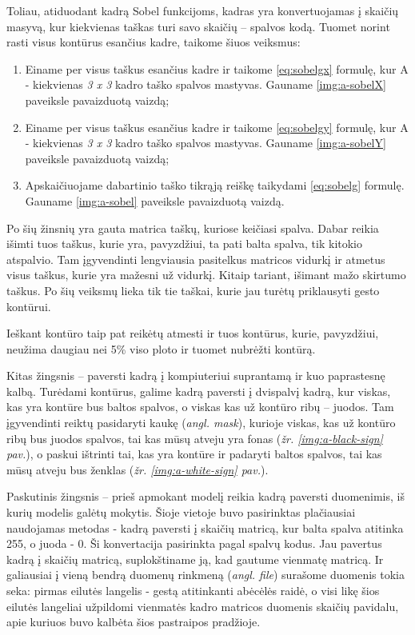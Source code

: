 \documentclass{VUMIFInfKursinis}
\begin{document}
Toliau, atiduodant kadrą Sobel funkcijoms, kadras yra konvertuojamas į skaičių masyvą, kur kiekvienas taškas turi savo skaičių – spalvos kodą. Tuomet norint rasti visus kontūrus esančius kadre, taikome šiuos veiksmus:

\begin{enumerate}
	\item Einame per visus taškus esančius kadre ir taikome \ref{eq:sobelgx} formulę, kur A - kiekvienas \textit{3 x 3} kadro taško spalvos mastyvas. Gauname \ref{img:a-sobelX} paveiksle pavaizduotą vaizdą;
	\item Einame per visus taškus esančius kadre ir taikome \ref{eq:sobelgy} formulę, kur A - kiekvienas \textit{3 x 3} kadro taško spalvos mastyvas. Gauname \ref{img:a-sobelY} paveiksle pavaizduotą vaizdą;
	\item Apskaičiuojame dabartinio taško tikrąją reiškę taikydami \ref{eq:sobelg} formulę. Gauname \ref{img:a-sobel} paveiksle pavaizduotą vaizdą.
\end{enumerate}

Po šių žinsnių yra gauta matrica taškų, kuriose keičiasi spalva. Dabar reikia išimti tuos taškus, kurie yra, pavyzdžiui, ta pati balta spalva, tik kitokio atspalvio. Tam įgyvendinti lengviausia pasitelkus matricos vidurkį ir atmetus visus taškus, kurie yra mažesni už vidurkį. Kitaip tariant, išimant mažo skirtumo taškus. Po šių veiksmų lieka tik tie taškai, kurie jau turėtų priklausyti gesto kontūrui.

Ieškant kontūro taip pat reikėtų atmesti ir tuos kontūrus, kurie, pavyzdžiui, neužima daugiau nei 5\% viso ploto ir tuomet nubrėžti kontūrą.

Kitas žingsnis – paversti kadrą į kompiuteriui suprantamą ir kuo paprastesnę kalbą. Turėdami kontūrus, galime kadrą paversti į dvispalvį kadrą, kur viskas, kas yra kontūre bus baltos spalvos, o viskas kas už kontūro ribų – juodos. Tam įgyvendinti reiktų pasidaryti kaukę (\textit{angl. mask}), kurioje viskas, kas už kontūro ribų bus juodos spalvos, tai kas mūsų atveju yra fonas (\textit{žr. \ref{img:a-black-sign} pav.}), o paskui ištrinti tai, kas yra kontūre ir padaryti baltos spalvos, tai kas mūsų atveju bus ženklas (\textit{žr. \ref{img:a-white-sign} pav.}).

Paskutinis žingsnis – prieš apmokant modelį reikia kadrą paversti duomenimis, iš kurių modelis galėtų mokytis. Šioje vietoje buvo pasirinktas plačiausiai naudojamas metodas - kadrą paversti į skaičių matricą, kur balta spalva atitinka 255, o juoda - 0. Ši konvertacija pasirinkta pagal spalvų kodus. Jau pavertus kadrą į skaičių matricą, suplokštiname ją, kad gautume vienmatę matricą. Ir galiausiai į vieną bendrą duomenų rinkmeną (\textit{angl. file}) surašome duomenis tokia seka: pirmas eilutės langelis - gestą atitinkanti abėcėlės raidė, o visi likę šios eilutės langeliai užpildomi vienmatės kadro matricos duomenis skaičių pavidalu, apie kuriuos buvo kalbėta šios pastraipos pradžioje.
\end{document}
